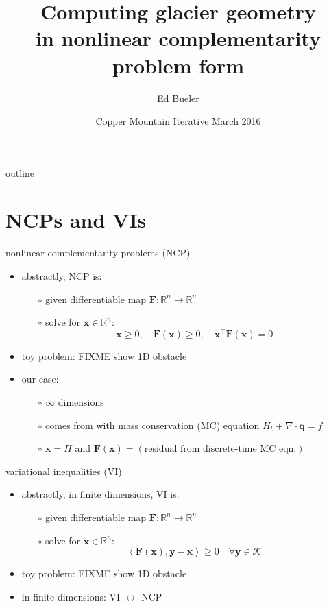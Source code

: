 \documentclass{beamer}
\title[Computing glacier geometry]{Computing glacier geometry \\ in nonlinear complementarity problem form}
\author{Ed Bueler}
\institute[UAF] %
{
  Dept of Mathematics and Statistics, and Geophysical Institute\\
  University of Alaska Fairbanks \\
  \tiny (\emph{funded by NASA Modeling, Analysis, and Prediction program})%
}
\date[Copper Mtn 2016]{Copper Mountain Iterative March 2016}
\newcommand\bq{\mathbf{q}}
\newcommand\bx{\mathbf{x}}
\newcommand\by{\mathbf{y}}
\newcommand\bF{\mathbf{F}}
\newcommand\RR{\mathbb{R}}
\newcommand\Div{\nabla\cdot}
\newcommand{\ip}[2]{\ensuremath{\left<#1,#2\right>}}
\begin{document}
\graphicspath{{../../talks-public/commonfigs/}}

\begin{frame}
  \titlepage
\end{frame}


\begin{frame}{outline}
  \tableofcontents
\end{frame}


\section{NCPs and VIs}

\begin{frame}{nonlinear complementarity problems (NCP)}

\begin{itemize}
\item abstractly, NCP is:
  \begin{itemize}
  \item[$\circ$]  given differentiable map $\bF:\RR^n \to \RR^n$
  \item[$\circ$]  solve for $\bx\in\RR^n$:
     $$\bx \ge 0, \quad \bF(\bx) \ge 0, \quad \bx^\top \bF(\bx) = 0$$
  \end{itemize}
\item toy problem:  FIXME show 1D obstacle
\item our case:
  \begin{itemize}
  \item[$\circ$]  $\infty$ dimensions
  \item[$\circ$] comes from with mass conservation (MC) equation $H_t + \Div\bq = f$
  \item[$\circ$]  $\bx = H$ and $\bF(\bx) = (\text{residual from discrete-time  MC eqn.})$
  \end{itemize}
\end{itemize}
\end{frame}


\begin{frame}{variational inequalities (VI)}

\begin{itemize}
\item abstractly, in finite dimensions, VI is:
  \begin{itemize}
  \item[$\circ$]  given differentiable map $\bF:\RR^n \to \RR^n$
  \item[$\circ$]  solve for $\bx\in\RR^n$:
     $$\ip{\bF(\bx)}{\by-\bx} \ge 0 \quad \forall \by \in \mathcal{K}$$
  \end{itemize}
\item toy problem:  FIXME show 1D obstacle
\item in finite dimensions: VI $\leftrightarrow$ NCP
\end{itemize}
\end{frame}
\end{document}
